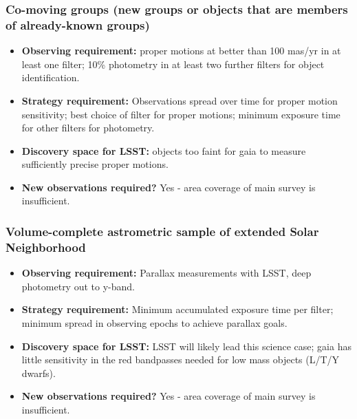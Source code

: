 \subsubsection{Co-moving groups (new groups or objects that are members of already-known groups)}
\vspace{-2mm}
\begin{itemize}
\item {\bf Observing requirement:}  proper motions at better than 100 mas/yr in at least one filter; 10\% photometry in at least two further filters for object identification. 
\vspace{-2mm}

\item {\bf Strategy requirement:} Observations spread over time for proper motion sensitivity; best choice of filter for proper motions; minimum exposure time for other filters for photometry. 
\vspace{-2mm}

\item {\bf Discovery space for LSST:} objects too faint for gaia to measure sufficiently precise proper motions. 
\vspace{-2mm}

\item {\bf New observations required?} Yes - area coverage of main survey is insufficient.
\vspace{-2mm}
\end{itemize}

\subsubsection{Volume-complete astrometric sample of extended Solar Neighborhood}
\vspace{-2mm}
\begin{itemize}

\item {\bf Observing requirement:} Parallax measurements with LSST, deep photometry out to y-band. 
\vspace{-2mm}

\item {\bf Strategy requirement:} Minimum accumulated exposure time per filter; minimum spread in observing epochs to achieve parallax goals. 
\vspace{-2mm}

\item {\bf Discovery space for LSST:} LSST will likely lead this science case; gaia has little sensitivity in the red bandpasses needed for low mass objects (L/T/Y dwarfs). 
\vspace{-2mm}

\item {\bf New observations required?} Yes - area coverage of main survey is insufficient.
\vspace{-2mm}
\end{itemize}



